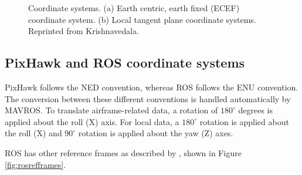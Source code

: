 \begin{figure}%
	\centering
	\caption[ECEF coordinate system]{\small Coordinate systems. (a) Earth centric, earth fixed (ECEF) coordinate system. (b) Local tangent plane coordinate systems. Reprinted from Krishnavedala. 
	}%
	\label{fig:coordinatesystem}%
\end{figure}

\subsection{PixHawk and ROS coordinate systems}

PixHawk follows the NED convention, whereas ROS follows the ENU convention. The conversion between these different conventions is handled automatically by MAVROS. To translate airframe-related data, a rotation of $180^{\circ}$ degrees is applied about the roll (X) axis. For local data, a $180^{\circ}$ rotation is applied about the roll (X) and $90^{\circ}$ rotation is applied about the yaw (Z) axes.

ROS has other reference frames as described by , shown in Figure \ref{fig:rosrefframes}.

